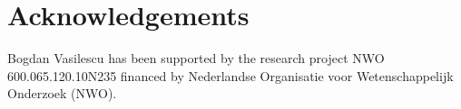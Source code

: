 
\section{Acknowledgements}
\label{sec:acknowledgements}

Bogdan Vasilescu has been supported by the research project NWO 600.065.120.10N235 financed by Nederlandse Organisatie voor Wetenschappelijk Onderzoek (NWO). 